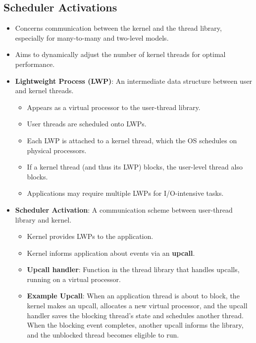 \subsection{Scheduler Activations}
\begin{itemize}
    \item Concerns communication between the kernel and the thread library, especially for many-to-many and two-level models.
    \item Aims to dynamically adjust the number of kernel threads for optimal performance.
    \item \textbf{Lightweight Process (LWP)}: An intermediate data structure between user and kernel threads.
        \begin{itemize}
            \item Appears as a virtual processor to the user-thread library.
            \item User threads are scheduled onto LWPs.
            \item Each LWP is attached to a kernel thread, which the OS schedules on physical processors.
            \item If a kernel thread (and thus its LWP) blocks, the user-level thread also blocks.
            \item Applications may require multiple LWPs for I/O-intensive tasks.
        \end{itemize}
    \item \textbf{Scheduler Activation}: A communication scheme between user-thread library and kernel.
        \begin{itemize}
            \item Kernel provides LWPs to the application.
            \item Kernel informs application about events via an \textbf{upcall}.
            \item \textbf{Upcall handler}: Function in the thread library that handles upcalls, running on a virtual processor.
            \item \textbf{Example Upcall}: When an application thread is about to block, the kernel makes an upcall, allocates a new virtual processor, and the upcall handler saves the blocking thread's state and schedules another thread. When the blocking event completes, another upcall informs the library, and the unblocked thread becomes eligible to run.
        \end{itemize}
\end{itemize}

